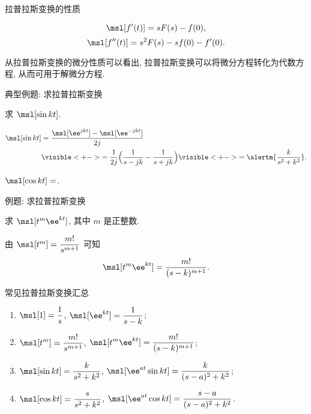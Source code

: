 \begin{frame}{拉普拉斯变换的性质}
	\onslide<+->
	\begin{theorem*}[][微分性质]
	\[
		\msl[f'(t)]=sF(s)-f(0),
	\]
	\[
		\msl[f''(t)]=s^2F(s)-sf(0)-f'(0).
	\]
	\end{theorem*}
	\onslide<+->
	从拉普拉斯变换的微分性质可以看出, 拉普拉斯变换可以将微分方程转化为代数方程, 从而可用于解微分方程.
\end{frame}


\begin{frame}{典型例题: 求拉普拉斯变换}
	\onslide<+->
	\begin{example}[nearnext]
		求 $\msl[\sin{kt}]$.
	\end{example}
	\onslide<+->
	\begin{solution}[nearprev]
		\begin{align*}
			\msl[\sin{kt}]&=\frac{\msl[\ee^{jkt}]-\msl[\ee^{-jkt}]}{2j}\\
			&\visible<+->{=\frac1{2j}\Bigl(\frac1{s-jk}-\frac1{s+jk}\Bigr)}
			\visible<+->{=\alertm{\frac k{s^2+k^2}}.}
		\end{align*}
	\end{solution}
	\onslide<+->
	\begin{exercise}
		$\msl[\cos{kt}]=$.
	\end{exercise}
\end{frame}


\begin{frame}{例题: 求拉普拉斯变换}
	\onslide<+->
	\begin{example}[nearnext]
		求 $\msl[t^m\ee^{kt}]$, 其中 $m$ 是正整数.
	\end{example}
	\onslide<+->
	\begin{solution}[nearprev]
		由 $\msl[t^m]=\dfrac{m!}{s^{m+1}}$ 可知
		\[
			\msl[t^m\ee^{kt}]=\frac{m!}{(s-k)^{m+1}}.
		\]
	\end{solution}
\end{frame}


\begin{frame}{常见拉普拉斯变换汇总}
	\onslide<+->
	\begin{theorem*}[][与有理函数有关的拉普拉斯变换汇总]
		\begin{enumerate}
			\item $\displaystyle\msl[1]=\frac1s$, 
			$\displaystyle \msl[\ee^{kt}]=\frac1{s-k}$;
			\item $\displaystyle\msl[t^m]=\frac{m!}{s^{m+1}}$, 
			$\displaystyle\msl[t^m\ee^{kt}]=\frac{m!}{(s-k)^{m+1}}$;
			\item $\displaystyle\msl[\sin kt]=\frac{k}{s^2+k^2}$, 
			$\displaystyle\msl[\ee^{at}\sin kt]=\frac{k}{(s-a)^2+k^2}$;
			\item $\displaystyle\msl[\cos kt]=\frac{s}{s^2+k^2}$,
			$\displaystyle\msl[\ee^{at}\cos kt]=\frac{s-a}{(s-a)^2+k^2}$.
		\end{enumerate}
	\end{theorem*}
\end{frame}


